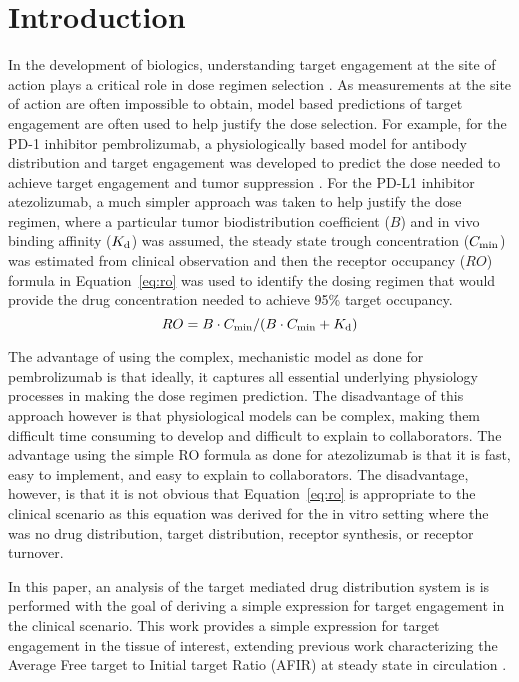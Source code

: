 \section*{Introduction}
In the development of biologics, understanding target engagement at the site of action plays a critical role in dose regimen selection \cite{wang16}.  As measurements at the site of action are often impossible to obtain, model based predictions of target engagement are often used to help justify the dose selection.  For example, for the PD-1 inhibitor pembrolizumab, a physiologically based model for antibody distribution and target engagement was developed to predict the dose needed to achieve target engagement and tumor suppression \cite{lindauer17}.  For the PD-L1 inhibitor atezolizumab, a much simpler approach was taken to help justify the dose regimen, where a particular tumor biodistribution coefficient ($B$) and in vivo binding affinity ($K_\text{d}$) was assumed, the steady state trough concentration ($C_\text{min}$) was estimated from clinical observation and then the receptor occupancy ($RO$) formula in Equation~\ref{eq:ro} was used to identify the dosing regimen that would provide the drug concentration needed to achieve 95\% target occupancy.
\begin{equation}
RO = B\cdot C_\text{min}/(B\cdot C_\text{min}+K_\text{d})
\label{eq:ro}
\end{equation}

The advantage of using the complex, mechanistic model as done for pembrolizumab is that ideally, it captures all essential underlying physiology processes in making the dose regimen prediction.  The disadvantage of this approach however is that physiological models can be complex, making them difficult time consuming to develop and difficult to explain to collaborators.  The advantage using the simple RO formula as done for atezolizumab is that it is fast, easy to implement, and easy to explain to collaborators.  The disadvantage, however, is that it is not obvious that Equation~\ref{eq:ro} is appropriate to the clinical scenario as this equation was derived for the in vitro setting \cite{boeynaems80} where the was no drug distribution, target distribution, receptor synthesis, or receptor turnover.

In this paper, an analysis of the target mediated drug distribution system is is performed with the goal of deriving a simple expression for target engagement in the clinical scenario.  This work provides a simple expression for target engagement in the tissue of interest, extending previous work characterizing the Average Free target to Initial target Ratio (AFIR) at steady state in circulation \cite{stein17}.